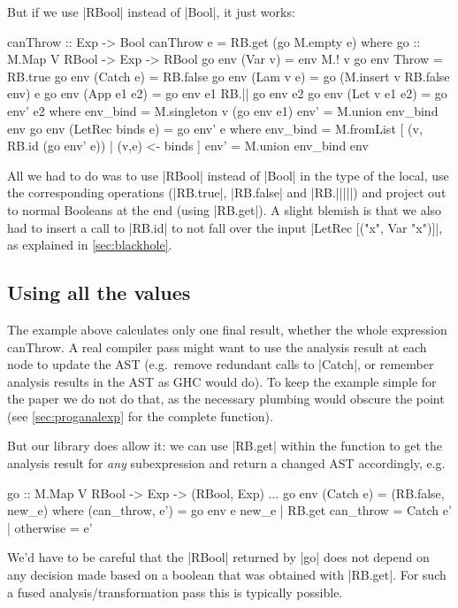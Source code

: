 \documentclass[manuscript,screen,acmsmall,nonacm]{acmart}
\begin{document}
But if we use |RBool| instead of |Bool|, it just works:
\restorecolumns
\begin{code}
canThrow :: Exp -> Bool
canThrow e = RB.get (go M.empty e)
  where
    go :: M.Map V RBool -> Exp -> RBool
    go env (Var v)          = env M.! v
    go env Throw            = RB.true
    go env (Catch e)        = RB.false
    go env (Lam v e)        = go (M.insert v RB.false env) e
    go env (App e1 e2)      = go env e1 RB.|| go env e2
    go env (Let v e1 e2)    = go env' e2
      where
        env_bind  = M.singleton v (go env e1)
        env'      = M.union env_bind env
    go env (LetRec binds e) = go env' e
      where
        env_bind  = M.fromList [ (v, RB.id (go env' e)) | (v,e) <- binds ]
        env'      = M.union env_bind env
\end{code}
All we had to do was to use |RBool| instead of |Bool| in the type of the local, use the corresponding operations (|RB.true|, |RB.false| and |RB.|||||) and  project out to normal Booleans at the end (using |RB.get|). A slight blemish is that we also had to insert a call to |RB.id| to not fall over the input |LetRec [("x", Var "x")]|, as explained in \cref{sec:blackhole}.

\subsection{Using all the values}\label{sec:all-values}

The example above calculates only one final result, whether the whole expression canThrow. A real compiler pass might want to use the analysis result at each node to update the AST (e.g.\ remove redundant calls to |Catch|, or remember analysis results in the AST as GHC would do). To keep the example simple for the paper we do not do that, as the necessary plumbing would obscure the point (see \cref{sec:proganalexp} for the complete function).

But our library does allow it: we can use |RB.get| within the function to get the analysis result for \emph{any} subexpression and return a changed AST accordingly, e.g.
\restorecolumns
\begin{code}
    go :: M.Map V RBool -> Exp -> (RBool, Exp)
    ...
    go env (Catch e)        = (RB.false, new_e)
      where
        (can_throw, e') = go env e
        new_e  |  RB.get can_throw  = Catch e'
               |  otherwise         = e'
\end{code}
We'd have to be careful that the |RBool| returned by |go| does not depend on any decision made based on a boolean that was obtained with |RB.get|. For such a fused analysis/transformation pass this is typically possible.
\end{document}
